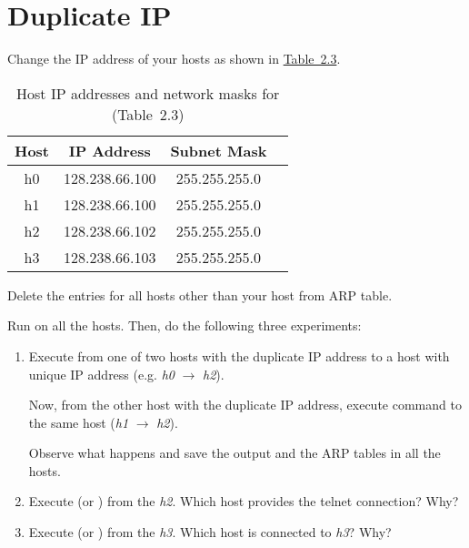 \documentclass{../UTNetLab}
\begin{document}
\section{Duplicate IP}\label{sec:duplicate-ip}
Change the IP address of your hosts as shown in \hyperref[tab:2.3]{Table~2.3}.

\begin{table}[H]
    \caption{Host IP addresses and network masks for  (Table~2.3)}\label{tab:2.3}
    \centering
    \begin{tabular}{ c c c c }
        \hline \hline
        Host & IP Address     & Subnet Mask   \\
        \hline
        h0   & 128.238.66.100 & 255.255.255.0 \\
        h1   & 128.238.66.100 & 255.255.255.0 \\
        h2   & 128.238.66.102 & 255.255.255.0 \\
        h3   & 128.238.66.103 & 255.255.255.0 \\
        \hline \hline
    \end{tabular}
\end{table}

Delete the entries for all hosts other than your host from ARP table.

Run  on all the hosts.
Then, do the following three experiments:

\begin{enumerate}
    \item Execute  from one of two hosts with the duplicate IP address to a host with unique IP address (e.g. \textit{h0} $\rightarrow$ \textit{h2}).

          Now, from the other host with the duplicate IP address, execute  command to the same host (\textit{h1} $\rightarrow$ \textit{h2}).

          Observe what happens and save the  output and the ARP tables in all the hosts.

    \item Execute  (or ) from the \textit{h2}.
          Which host provides the telnet connection?
          Why?

    \item Execute  (or ) from the \textit{h3}.
          Which host is connected to \textit{h3}? Why?
\end{enumerate}
\end{document}
